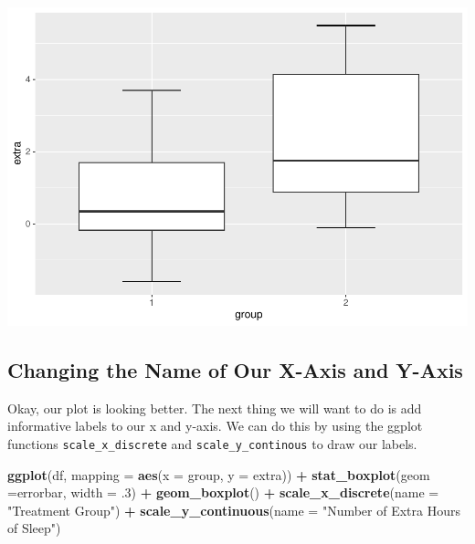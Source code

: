 \documentclass[
]{book}
\newenvironment{Shaded}{\begin{snugshade}}{\end{snugshade}}
\newcommand{\AttributeTok}[1]{\textcolor[rgb]{0.13,0.29,0.53}{#1}}
\newcommand{\DecValTok}[1]{\textcolor[rgb]{0.00,0.00,0.81}{#1}}
\newcommand{\FunctionTok}[1]{\textcolor[rgb]{0.13,0.29,0.53}{\textbf{#1}}}
\newcommand{\NormalTok}[1]{#1}
\newcommand{\SpecialCharTok}[1]{\textcolor[rgb]{0.81,0.36,0.00}{\textbf{#1}}}
\newcommand{\StringTok}[1]{\textcolor[rgb]{0.31,0.60,0.02}{#1}}
\begin{document}
\includegraphics{rintro_demo_files/figure-latex/unnamed-chunk-282-1.pdf}

\hypertarget{changing-the-name-of-our-x-axis-and-y-axis}{%
\subsection{Changing the Name of Our X-Axis and Y-Axis}\label{changing-the-name-of-our-x-axis-and-y-axis}}

Okay, our plot is looking better. The next thing we will want to do is add informative labels to our x and y-axis. We can do this by using the ggplot functions \texttt{scale\_x\_discrete} and \texttt{scale\_y\_continous} to draw our labels.

\begin{Shaded}
\begin{Highlighting}[]
\FunctionTok{ggplot}\NormalTok{(df, }\AttributeTok{mapping =} \FunctionTok{aes}\NormalTok{(}\AttributeTok{x =}\NormalTok{ group, }\AttributeTok{y =}\NormalTok{ extra)) }\SpecialCharTok{+}
  \FunctionTok{stat\_boxplot}\NormalTok{(}\AttributeTok{geom =}\StringTok{\textquotesingle{}errorbar\textquotesingle{}}\NormalTok{, }\AttributeTok{width =}\NormalTok{ .}\DecValTok{3}\NormalTok{) }\SpecialCharTok{+}
  \FunctionTok{geom\_boxplot}\NormalTok{() }\SpecialCharTok{+} 
  \FunctionTok{scale\_x\_discrete}\NormalTok{(}\AttributeTok{name =} \StringTok{"Treatment Group"}\NormalTok{) }\SpecialCharTok{+} 
  \FunctionTok{scale\_y\_continuous}\NormalTok{(}\AttributeTok{name =} \StringTok{"Number of Extra Hours of Sleep"}\NormalTok{)}
\end{Highlighting}
\end{Shaded}
\end{document}
